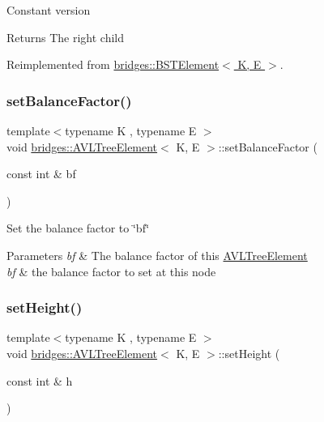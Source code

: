 Constant version

\begin{DoxyReturn}{Returns}
The right child 
\end{DoxyReturn}


Reimplemented from \hyperlink{classbridges_1_1_b_s_t_element_ae4e7b750eada97074a42e7f54b320a29}{bridges\+::\+B\+S\+T\+Element$<$ K, E $>$}.

\hypertarget{classbridges_1_1_a_v_l_tree_element_a076ec482874d248764348e62dd4652d2}{}\label{classbridges_1_1_a_v_l_tree_element_a076ec482874d248764348e62dd4652d2} 
\subsubsection{\texorpdfstring{set\+Balance\+Factor()}{setBalanceFactor()}}
{\footnotesize\ttfamily template$<$typename K , typename E $>$ \\
void \hyperlink{classbridges_1_1_a_v_l_tree_element}{bridges\+::\+A\+V\+L\+Tree\+Element}$<$ K, E $>$\+::set\+Balance\+Factor (\begin{DoxyParamCaption}\item[{const int \&}]{bf }\end{DoxyParamCaption})\hspace{0.3cm}{\ttfamily [inline]}}

Set the balance factor to \char`\"{}bf\char`\"{} 
\begin{DoxyParams}{Parameters}
{\em bf} & The balance factor of this \hyperlink{classbridges_1_1_a_v_l_tree_element}{A\+V\+L\+Tree\+Element}\\
\hline
{\em bf} & the balance factor to set at this node \\
\hline
\end{DoxyParams}
\hypertarget{classbridges_1_1_a_v_l_tree_element_acbf2a222b954e5d9221b109634822f96}{}\label{classbridges_1_1_a_v_l_tree_element_acbf2a222b954e5d9221b109634822f96} 
\subsubsection{\texorpdfstring{set\+Height()}{setHeight()}}
{\footnotesize\ttfamily template$<$typename K , typename E $>$ \\
void \hyperlink{classbridges_1_1_a_v_l_tree_element}{bridges\+::\+A\+V\+L\+Tree\+Element}$<$ K, E $>$\+::set\+Height (\begin{DoxyParamCaption}\item[{const int \&}]{h }\end{DoxyParamCaption})\hspace{0.3cm}{\ttfamily [inline]}}

